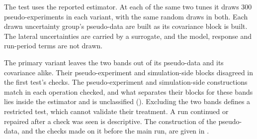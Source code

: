 The test uses the reported estimator. At each of the same two tunes it draws 300 pseudo-experiments in each variant, with the same random draws in both. Each drawn uncertainty group's pseudo-data are built as its covariance block is built. The lateral uncertainties are carried by a surrogate, and the model, response and run-period terms are not drawn.

The primary variant leaves the two bands out of its pseudo-data and its covariance alike. Their pseudo-experiment and simulation-side blocks disagreed in the first test's checks.
The pseudo-experiment and simulation-side constructions match in each operation checked, and what separates their blocks for these bands lies inside the estimator and is unclassified (). Excluding the two bands defines a restricted test, which cannot validate their treatment. A run continued or repaired after a check was seen is descriptive.
The construction of the pseudo-data, and the checks made on it before the main run, are given in .


